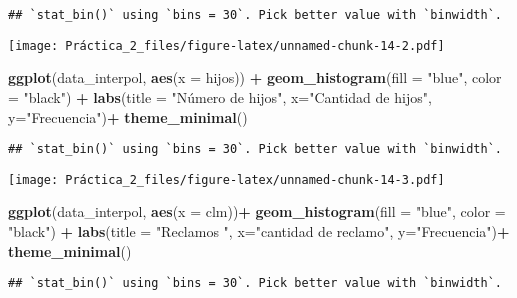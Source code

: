 \documentclass[
]{article}
\newenvironment{Shaded}{\begin{snugshade}}{\end{snugshade}}
\newcommand{\AttributeTok}[1]{\textcolor[rgb]{0.13,0.29,0.53}{#1}}
\newcommand{\FunctionTok}[1]{\textcolor[rgb]{0.13,0.29,0.53}{\textbf{#1}}}
\newcommand{\NormalTok}[1]{#1}
\newcommand{\SpecialCharTok}[1]{\textcolor[rgb]{0.81,0.36,0.00}{\textbf{#1}}}
\newcommand{\StringTok}[1]{\textcolor[rgb]{0.31,0.60,0.02}{#1}}
\begin{document}
\begin{verbatim}
## `stat_bin()` using `bins = 30`. Pick better value with `binwidth`.
\end{verbatim}

\texttt{[image: Práctica\_2\_files/figure-latex/unnamed-chunk-14-2.pdf]}

\begin{Shaded}
\begin{Highlighting}[]
\FunctionTok{ggplot}\NormalTok{(data\_interpol, }\FunctionTok{aes}\NormalTok{(}\AttributeTok{x =}\NormalTok{ hijos)) }\SpecialCharTok{+}
  \FunctionTok{geom\_histogram}\NormalTok{(}\AttributeTok{fill =} \StringTok{"blue"}\NormalTok{, }\AttributeTok{color =} \StringTok{"black"}\NormalTok{) }\SpecialCharTok{+}
  \FunctionTok{labs}\NormalTok{(}\AttributeTok{title =} \StringTok{"Número de hijos"}\NormalTok{, }\AttributeTok{x=}\StringTok{"Cantidad de hijos"}\NormalTok{, }\AttributeTok{y=}\StringTok{"Frecuencia"}\NormalTok{)}\SpecialCharTok{+}
  \FunctionTok{theme\_minimal}\NormalTok{()}
\end{Highlighting}
\end{Shaded}

\begin{verbatim}
## `stat_bin()` using `bins = 30`. Pick better value with `binwidth`.
\end{verbatim}

\texttt{[image: Práctica\_2\_files/figure-latex/unnamed-chunk-14-3.pdf]}

\begin{Shaded}
\begin{Highlighting}[]
\FunctionTok{ggplot}\NormalTok{(data\_interpol, }\FunctionTok{aes}\NormalTok{(}\AttributeTok{x =}\NormalTok{ clm))}\SpecialCharTok{+}
  \FunctionTok{geom\_histogram}\NormalTok{(}\AttributeTok{fill =} \StringTok{"blue"}\NormalTok{, }\AttributeTok{color =} \StringTok{"black"}\NormalTok{) }\SpecialCharTok{+}
  \FunctionTok{labs}\NormalTok{(}\AttributeTok{title =} \StringTok{"Reclamos "}\NormalTok{, }\AttributeTok{x=}\StringTok{"cantidad de reclamo"}\NormalTok{, }\AttributeTok{y=}\StringTok{"Frecuencia"}\NormalTok{)}\SpecialCharTok{+}
  \FunctionTok{theme\_minimal}\NormalTok{()}
\end{Highlighting}
\end{Shaded}

\begin{verbatim}
## `stat_bin()` using `bins = 30`. Pick better value with `binwidth`.
\end{verbatim}
\end{document}
